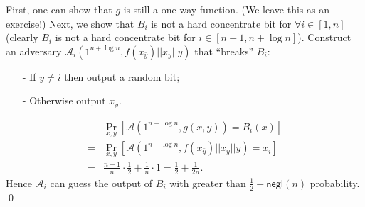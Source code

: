 \documentclass[12pt]{tufte-book}
\begin{document}
First, one can show that $g$ is still a one-way function. (We leave this as an exercise!)
Next, we show that $B_i$ is not a hard concentrate bit for $\forall i \in [1, n]$ (clearly $B_i$ is not a hard concentrate bit for $i \in [n+1, n+\log n]$).
Construct an adversary $\mathcal{A}_i(1^{n+\log n}, f(x_{\bar y}) || x_y || y)$ that ``breaks'' $B_i$:
\begin{itemize}
\item[-] If $y \not= i$ then output a random bit;
\item[-] Otherwise output $x_y$.
\end{itemize}
\begin{align*}
& \Pr_{x, y}[\mathcal{A}(1^{n+\log n}, g(x,y)) = B_i(x)]\\
=& \Pr_{x, y}[\mathcal{A}(1^{n+\log n}, f(x_{\bar y}) || x_y || y) = x_i]\\
=& \frac{n-1}{n} \cdot \frac{1}{2} + \frac{1}{n} \cdot 1 = \frac{1}{2} + \frac{1}{2n}.
\end{align*}
Hence $\mathcal{A}_i$ can guess the output of $B_i$ with greater than $\frac{1}{2} + \mathsf{negl}(n)$ probability.
\qed

\end{document}
